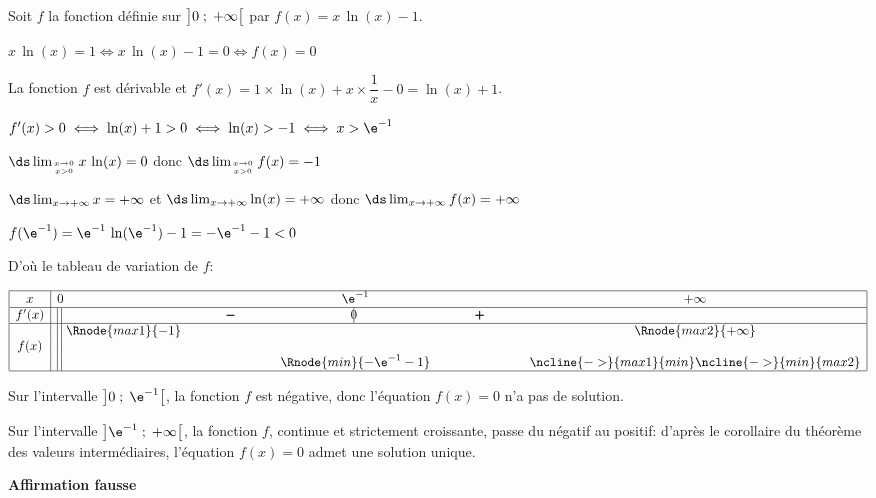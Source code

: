 Soit $f$ la fonction définie sur $\left ]0\;;\;+\infty\strut\right [$ par $f(x)=x\,\ln(x)-1$.

$x\, \ln (x) = 1 \iff x\, \ln (x) - 1 = 0 \iff f(x)=0$

\begin{list}{\textbullet}{}
	\item La fonction $f$ est dérivable et $f'(x)=1\times \ln(x) + x\times \dfrac{1}{x}-0=\ln(x)+1$.
	\item $f'(x)>0 \iff \ln(x) +1>0 \iff \ln(x)>-1 \iff x>\e^{-1}$
	\item $\ds\lim_{x\to 0 \atop x>0} x\,\ln(x)=0$ donc $\ds\lim_{x\to 0 \atop x>0} f(x)=-1$
	\item $\ds\lim_{x\to +\infty} x =+\infty$ et $\ds\lim_{x\to +\infty} \ln(x)=+\infty$ donc $\ds\lim_{x\to +\infty} f(x)=+\infty$
	\item  $f(\e^{-1})=\e^{-1}\,\ln(\e^{-1})-1 = -\e^{-1}-1<0$
\end{list}

D'où le tableau de variation de $f$:

\begin{center}
	{\renewcommand{\arraystretch}{1.1}
		\def\esp{\hspace*{2cm}}%
		\def\hauteur{0pt}%
		$\begin{array}{|c| l  *4{c}|}
			\hline
			x & 0 & \esp & \e^{-1} & \esp & +\infty \\
			\hline
			f'(x) & \vline\;\vline &  \pmb{-} & \vline\hspace{-2.7pt}0 & \pmb{+} & \\  
			\hline
			& \vline\;\vline~\Rnode{max1}{-1}  &  &  &  & \Rnode{max2}{+\infty} \\
			f(x) &\vline\;\vline &  & & &  \rule{0pt}{\hauteur} \\
			& \vline\;\vline & &   \Rnode{min}{-\e^{-1}-1} & & \rule{0pt}{\hauteur}
			\ncline{->}{max1}{min} \ncline{->}{min}{max2}\\
			\hline
		\end{array}$
	}
\end{center}	

Sur l'intervalle $\left ]0\;;\;\e^{-1}\strut\right [$, la fonction $f$ est négative, donc l'équation $f(x)=0$ n'a pas de solution.

Sur l'intervalle $\left ]\e^{-1}\;;\; +\infty\strut\right [$, la fonction $f$, continue et strictement croissante, passe du négatif au positif: d'après le corollaire du théorème des valeurs intermédiaires, l'équation $f(x)=0$ admet une solution unique.

\hfill\textbf{Affirmation fausse}